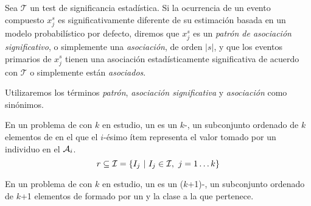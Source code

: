 \begin{defn}
   Sea $\mathcal{T}$ un test de significancia estadística. Si la ocurrencia de un evento compuesto $x_j^s$ es significativamente diferente de su estimación basada en un modelo probabilístico por defecto, diremos que $x_j^s$ es un \emph{patrón de asociación significativo}, o simplemente una \emph{asociación}, de orden $|s|$, y que los eventos primarios de $x_j^s$ tienen una asociación estadísticamente significativa de acuerdo con $\mathcal{T}$ o simplemente están \emph{asociados}.
\label{def:patron-de-asociación-significativo}
\end{defn}



Utilizaremos los términos \emph{patrón}, \emph{asociación significativa} y \emph{asociación} como sinónimos.




\clearpage












\begin{defn}[\Registro]
   En un problema de \Clasificacion con $k$ \atributos en estudio, un \registro \reg es un $k$-\itemset, un subconjunto ordenado de $k$ elementos de \I en el que el $i$-ésimo ítem representa el valor tomado por un individuo en el \atributo $\A_i$.
   \begin{equation}\label{eq:def-registro}
     \reg \subseteq \I = \left\{I_j\ | \ I_j \in \I,\ j = 1 \ldots k\right\}
   \end{equation}
\label{def:registro}
\end{defn}

\begin{defn}[\RegClas]
   En un problema de \Clasificacion con $k$ \atributos en estudio, un \RegClas es un ($k$+1)-\itemset, un subconjunto ordenado de $k$+1 elementos de \I formado por un \registro y la clase a la que pertenece.
\label{def:registro-clasificado}
\end{defn}

